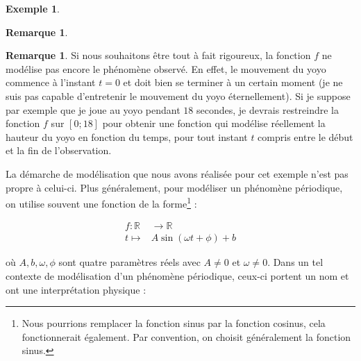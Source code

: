 \documentclass[a4paper,fontsize=13pt]{scrreprt}
\theoremstyle{plain}
\theoremstyle{definition}
\newtheorem{exe}[subsection]{Exemple}
\newtheorem{rema}[subsection]{Remarque}
\newcommand{\rr}{\mathbb{R}}
\newcommand {\grille}{\draw[help lines] (\xmin,\ymin) grid (\xmax,\ymax);}
\newcommand {\axes} {
	\draw[thick, ->] (\xmin,0) -- (\xmax+1,0);
	\draw[thick, ->] (0,\ymin) -- (0,\ymax+1);
	\draw (0,\ymax+0.5) node [left] {$y$};
	\draw (\xmax+0.5, 0) node [below] {$x$};
	\draw[thick] (-0.15,1)--(0.15,1) (1,-0.15)--(1,0.15);
	\draw (0,1)node[left]{$1$} (1,0)node[below]{$1$};
}
\begin{document}
\begin{exe}
\begin{rema}
\end{rema}
\begin{rema}
Si nous souhaitons être tout à fait rigoureux, la fonction $f$ ne modélise pas encore le phénomène observé. En effet, le mouvement du yoyo commence à l'instant $t=0$ et doit bien se terminer à un certain moment (je ne suis pas capable d'entretenir le mouvement du yoyo éternellement). Si je suppose par exemple que je joue au yoyo pendant $18$ secondes, je devrais restreindre la fonction $f$ sur $[0;18]$ pour obtenir une fonction qui modélise réellement la hauteur du yoyo en fonction du temps, pour tout instant $t$ compris entre le début et la fin de l'observation.

\end{rema}
\end{exe}
\newpage
La démarche de modélisation que nous avons réalisée pour cet exemple n'est pas propre à celui-ci. Plus généralement, pour modéliser un phénomène périodique, on utilise souvent une fonction de la forme\footnote{Nous pourrions remplacer la fonction sinus par la fonction cosinus, cela fonctionnerait également. Par convention, on choisit généralement la fonction sinus.} :
\begin{center}
\begin{align*}
		f : \rr &\to \rr \\
		t \mapsto& A \sin(\omega t+\phi) +b
		\end{align*}
\end{center}
où $A,b,\omega,\phi$ sont quatre paramètres réels avec $A \neq 0$ et $\omega \neq 0$. Dans un tel contexte de modélisation d'un phénomène périodique, ceux-ci portent un nom et ont une interprétation physique :~~\\
\end{document}
